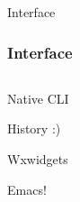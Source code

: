 \documentclass[12pt,usenames,pdftex]{beamer}
\begin{document}
\begin{frame}[<1->]{Interface}
  \frametitle{Interface}
  \begin{columns}
    \begin{column}{0.35\linewidth}
      \begin{description}
      \item<1->[maxima] Native CLI
      \item<2->[xmaxima] History :)
      \item<3->[wxmaxima] Wxwidgets
      \item<4->[imaxima] Emacs!
      \end{description}
    \end{column}
    \begin{column}{0.65\linewidth}
      \begin{center}
\end{center}
\end{column}
\end{columns}
\end{frame}
\end{document}
